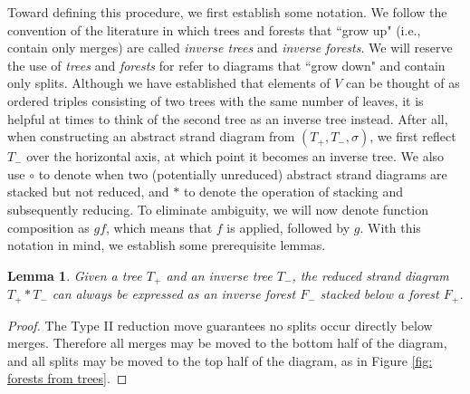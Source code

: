 \documentclass[11pt, twoside]{amsart}
\numberwithin{equation}{section}
\newtheorem{lemma}[theorem]{Lemma}
\theoremstyle{definition}
\numberwithin{equation}{section}
\begin{document}
Toward defining this procedure, we first establish some notation. We follow the convention of the literature in which trees and forests that ``grow up" (i.e., contain only merges) are called \textit{inverse trees} and \textit{inverse forests}. We will reserve the use of \textit{trees} and \textit{forests} for refer to diagrams that ``grow down" and contain only splits. Although we have established that elements of $V$ can be thought of as ordered triples consisting of two trees with the same number of leaves, it is helpful at times to think of the second tree as an inverse tree instead. After all, when constructing an abstract strand diagram from $(T_+,T_-,\sigma)$, we first reflect $T_-$ over the horizontal axis, at which point it becomes an inverse tree. We also use $\circ$ to denote when two (potentially unreduced) abstract strand diagrams are stacked but not reduced, and $*$ to denote the operation of stacking and subsequently reducing. To eliminate ambiguity, we will now denote function composition as $gf$, which means that $f$ is applied, followed by $g$. With this notation in mind, we establish some prerequisite lemmas.
\begin{lemma}\label{lem: trees to forests}
    Given a tree $T_+$ and an inverse tree $T_-$, the reduced strand diagram $T_{+} * T_-$ can always be expressed as an inverse forest $F_-$ stacked below a forest $F_+$.
\end{lemma}
\begin{proof}
    The Type II reduction move guarantees no splits occur directly below merges. Therefore all merges may be moved to the bottom half of the diagram, and all splits may be moved to the top half of the diagram, as in Figure \ref{fig: forests from trees}.
\end{proof}
\end{document}
